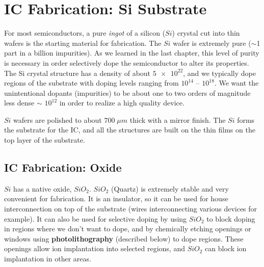 \section{IC Fabrication: Si Substrate}
For most semiconductors, a pure \textit{ingot} of a silicon ($Si$) crystal cut into thin wafers is the starting material for fabrication.  The $Si$ wafer is extremely pure ($\sim$1 part in a billion impurities).  As we learned in the last chapter, this level of purity is necessary in order selectively dope the semiconductor to alter its properties.  The Si crystal structure has a density of about $\num{5e22}$, and we typically dope regions of the substrate with doping levels ranging from  $10^{14}$ – $10^{18}$.  We want the unintentional dopants (impurities) to be about one to two orders of magnitude less dense $\sim$ $10^{12}$ in order to realize a high quality device.  

$Si$ wafers are polished to about $700\;\mu m$ thick with a mirror finish.  The $Si$ forms the substrate for the IC, and all the structures are built on the thin films on the top layer of the substrate.  
\subsection{IC Fabrication: Oxide}
$Si$ has a native oxide, $SiO_2$.  $SiO_2$ (Quartz) is extremely stable and very convenient for fabrication.  It is an insulator, so it can be used for house interconnection on top of the substrate (wires interconnecting various devices for example).  It can also be used for selective doping by using $SiO_2$ to block doping in regions where we don't want to dope, and by chemically etching openings or windows using \textbf{photolithography} (described below) to dope regions.  These openings allow ion implantation into selected regions, and $SiO_2$ can block ion implantation in other areas.
